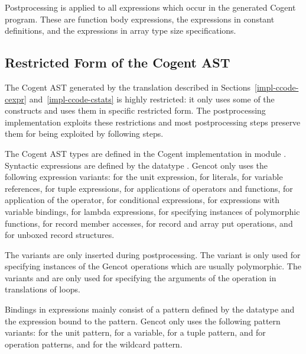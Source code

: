 Postprocessing is applied to all expressions which occur in the generated Cogent program. These are function 
body expressions, the expressions in constant definitions, and the expressions in array type size specifications.

\subsection{Restricted Form of the Cogent AST}
\label{impl-post-ast}

The Cogent AST generated by the translation described in Sections~\ref{impl-ccode-cexpr} and~\ref{impl-ccode-cstats}
is highly restricted: it only uses some of the constructs and uses them in specific restricted form. The postprocessing
implementation exploits these restrictions and most postprocessing steps preserve them for being exploited by following
steps.

The Cogent AST types are defined in the Cogent implementation in module . Syntactic expressions
are defined by the datatype . Gencot only uses the following expression variants:  for the unit
expression,  for literals,  for variable references, 
for tuple expressions,  for applications of operators and functions,  for application
of the  operator,  for conditional
expressions,  for expressions with variable bindings,  for lambda expressions,  for
specifying instances of polymorphic functions,  for record member accesses,  for record
and array put operations, and  for unboxed record structures.

The variants  are only inserted during postprocessing. The variant  is only
used for specifying instances of the Gencot operations which are usually polymorphic. The variants 
and  are only used for specifying the arguments of the  operation in translations of loops.

Bindings in  expressions mainly consist of a pattern defined by the datatype  and
the expression bound to the pattern. Gencot only uses the following pattern variants:  for the unit
pattern,  for a variable,  for a tuple pattern,  and  for
 operation patterns, and  for the wildcard pattern.

